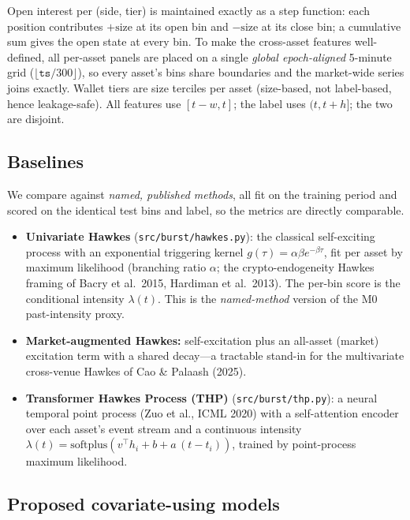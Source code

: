 \documentclass[11pt,a4paper]{article}
\begin{document}
Open interest per (side, tier) is maintained exactly as a step function: each position contributes $+\text{size}$ at its open bin and $-\text{size}$ at its close bin; a cumulative sum gives the open state at every bin. To make the cross-asset features well-defined, all per-asset panels are placed on a single \emph{global epoch-aligned} 5-minute grid ($\lfloor \texttt{ts}/300\rfloor$), so every asset's bins share boundaries and the market-wide series joins exactly. Wallet tiers are size terciles per asset (size-based, not label-based, hence leakage-safe). All features use $[t-w, t]$; the label uses $(t, t+h]$; the two are disjoint.

\subsection{Baselines}

We compare against \emph{named, published methods}, all fit on the training period and scored on the identical test bins and label, so the metrics are directly comparable.

\begin{itemize}[nosep]
    \item \textbf{Univariate Hawkes} (\texttt{src/burst/hawkes.py}): the classical self-exciting process with an exponential triggering kernel $g(\tau)=\alpha\beta e^{-\beta\tau}$, fit per asset by maximum likelihood (branching ratio $\alpha$; the crypto-endogeneity Hawkes framing of Bacry et al.\ 2015, Hardiman et al.\ 2013). The per-bin score is the conditional intensity $\lambda(t)$. This is the \emph{named-method} version of the M0 past-intensity proxy.
    \item \textbf{Market-augmented Hawkes:} self-excitation plus an all-asset (market) excitation term with a shared decay---a tractable stand-in for the multivariate cross-venue Hawkes of Cao \& Palaash (2025).
    \item \textbf{Transformer Hawkes Process (THP)} (\texttt{src/burst/thp.py}): a neural temporal point process (Zuo et al., ICML 2020) with a self-attention encoder over each asset's event stream and a continuous intensity $\lambda(t)=\text{softplus}(v^\top h_i + b + a\,(t-t_i))$, trained by point-process maximum likelihood.
\end{itemize}

\subsection{Proposed covariate-using models}
\end{document}
